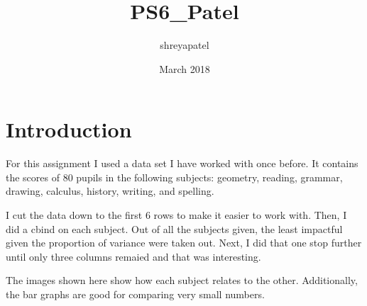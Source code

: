 \documentclass{article}
\title{PS6_Patel}
\author{shreyapatel }
\date{March 2018}
\begin{document}
\maketitle

\section{Introduction}


For this assignment I used a data set I have worked with once before. It contains the scores of 80 pupils in the following subjects: geometry, reading, grammar, drawing, calculus, history, writing, and spelling.

I cut the data down to the first 6 rows to make it easier to work with. Then, I did a cbind on each subject. Out of all the subjects given, the least impactful given the proportion of variance were taken out. Next, I did that one stop further until only three columns remaied and that was interesting.

The images shown here show how each subject relates to the other. Additionally, the bar graphs are good for comparing very small numbers.
\end{document}

